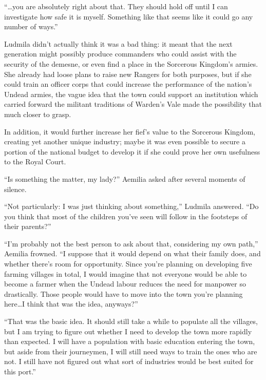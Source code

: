  

“…you are absolutely right about that. They should hold off until I can investigate how safe it is myself. Something like that seems like it could go any number of ways.”

 

Ludmila didn’t actually think it was a bad thing: it meant that the next generation might possibly produce commanders who could assist with the security of the demesne, or even find a place in the Sorcerous Kingdom’s armies. She already had loose plans to raise new Rangers for both purposes, but if she could train an officer corps that could increase the performance of the nation’s Undead armies, the vague idea that the town could support an institution which carried forward the militant traditions of Warden’s Vale made the possibility that much closer to grasp.

 

In addition, it would further increase her fief’s value to the Sorcerous Kingdom, creating yet another unique industry; maybe it was even possible to secure a portion of the national budget to develop it if she could prove her own usefulness to the Royal Court.

 

“Is something the matter, my lady?” Aemilia asked after several moments of silence.

 

“Not particularly: I was just thinking about something,” Ludmila answered. “Do you think that most of the children you’ve seen will follow in the footsteps of their parents?”

 

“I’m probably not the best person to ask about that, considering my own path,” Aemilia frowned. “I suppose that it would depend on what their family does, and whether there’s room for opportunity. Since you’re planning on developing five farming villages in total, I would imagine that not everyone would be able to become a farmer when the Undead labour reduces the need for manpower so drastically. Those people would have to move into the town you’re planning here…I think that was the idea, anyways?”

 

“That was the basic idea. It should still take a while to populate all the villages, but I am trying to figure out whether I need to develop the town more rapidly than expected. I will have a population with basic education entering the town, but aside from their journeymen, I will still need ways to train the ones who are not. I still have not figured out what sort of industries would be best suited for this port.”

